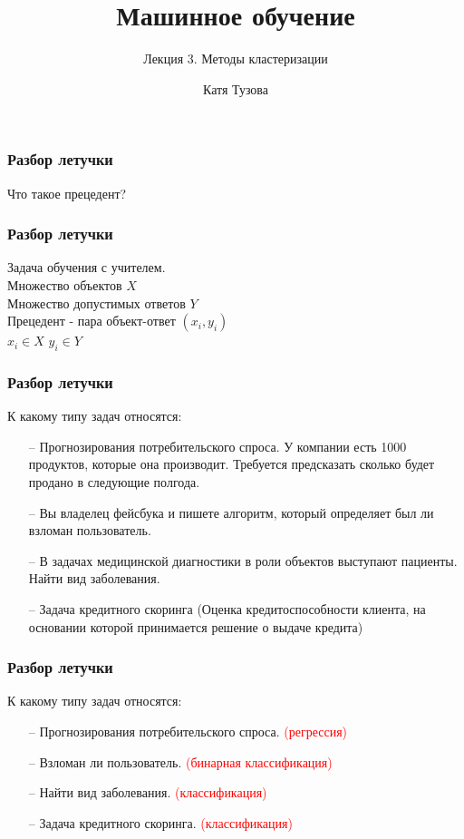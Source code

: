 \documentclass[12pt]{beamer}
\author{Катя Тузова}
\title{Машинное обучение}
\subtitle{Лекция 3. Методы кластеризации}
\date{}
\begin{document}
\frame{\titlepage}

\begin{frame}\frametitle{Разбор летучки}
	Что такое прецедент?
\end{frame}

\begin{frame}\frametitle{Разбор летучки}
	Задача обучения с учителем.\\
	\vspace{5mm}
	Множество объектов $X$ \\
	Множество допустимых ответов $Y$\\
	Прецедент - пара объект-ответ ${(x_i,y_i)}$  \\
	$x_i \in X$ 	$y_i \in Y$
\end{frame}

\begin{frame}\frametitle{Разбор летучки}
	К какому типу задач относятся:
	\begin{itemize}
		\item[--] Прогнозирования потребительского спроса. У компании есть 1000 продуктов, которые она производит. Требуется предсказать сколько будет продано в следующие полгода.
		\item[--] Вы владелец фейсбука и пишете алгоритм, который определяет был ли взломан пользователь. 
		\item[--] В задачах медицинской диагностики в роли объектов выступают пациенты. Найти вид заболевания.
		\item[--] Задача кредитного скоринга (Оценка кредитоспособности клиента, на основании которой принимается решение о выдаче кредита)
	\end{itemize}
\end{frame}

\begin{frame}\frametitle{Разбор летучки}
	К какому типу задач относятся:
	\begin{itemize}
		\item[--] Прогнозирования потребительского спроса. 
\textcolor{red}{(регрессия)}
		\item[--] Взломан ли пользователь. \textcolor{red}{(бинарная классификация)}
		\item[--] Найти вид заболевания. \textcolor{red}{(классификация)}
		\item[--] Задача кредитного скоринга.  \textcolor{red}{(классификация)}
	\end{itemize}
\end{frame}
\end{document}
